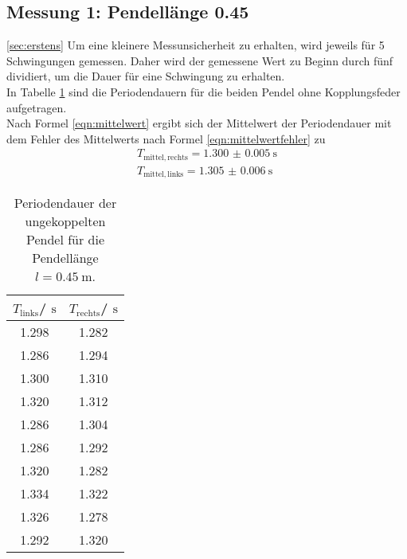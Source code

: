 \subsection{Messung 1: Pendellänge 0.45}
\ref{sec:erstens}
Um eine kleinere Messunsicherheit zu erhalten, wird jeweils für 5 Schwingungen gemessen. Daher wird der gemessene Wert zu Beginn durch fünf dividiert, um die Dauer für eine Schwingung zu erhalten.
\\In Tabelle \ref{tab:alinksrechts} sind die Periodendauern für die beiden Pendel ohne Kopplungsfeder aufgetragen.
\\Nach Formel \eqref{eqn:mittelwert} ergibt sich der Mittelwert der Periodendauer mit dem Fehler des Mittelwerts nach Formel \eqref{eqn:mittelwertfehler} zu
\begin{gather*}
	T_{\mathrm{mittel, rechts}}=\SI{1.300(5)}{\second}\\
	T_{\mathrm{mittel, links}}=\SI{1.305(6)}{\second}
\end{gather*}
\begin{table}
	\centering
	\caption{Periodendauer der ungekoppelten Pendel für die Pendellänge $l=\SI{0.45}{\meter}$.}
	\label{tab:alinksrechts}
	\begin{tabular}{cc}
		\toprule
		$T_{\mathrm{links}}$/ $\si{\second}$ & $T_{\mathrm{rechts}}$/ $\si{\second}$ \\
		\midrule
		1.298                                & 1.282                                 \\
		1.286                                & 1.294                                 \\
		1.300                                & 1.310                                 \\
		1.320                                & 1.312                                 \\
		1.286                                & 1.304                                 \\
		1.286                                & 1.292                                 \\
		1.320                                & 1.282                                 \\
		1.334                                & 1.322                                 \\
		1.326                                & 1.278                                 \\
		1.292                                & 1.320                                 \\
		\bottomrule
	\end{tabular}
\end{table}


